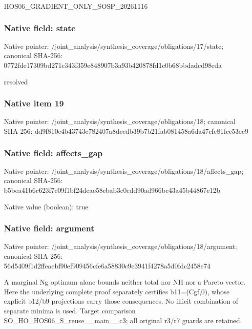 \documentclass[10pt,a4paper]{article}
\begin{document}
\begingroup\raggedright\sloppy HOS06\_\allowbreak{}GRADIENT\_\allowbreak{}ONLY\_\allowbreak{}SOSP\_\allowbreak{}20261116\par\endgroup

\subsubsection{Native field: state}
Native pointer: /joint\_\allowbreak{}analysis/synthesis\_\allowbreak{}coverage/obligations/17/state; canonical SHA-256: 0772fde17309bd271c343f359e848907b3a93b420878fd1e0b68bbdadcd98eda

\begingroup\raggedright\sloppy resolved\par\endgroup

\subsubsection{Native item 19}
Native pointer: /joint\_\allowbreak{}analysis/synthesis\_\allowbreak{}coverage/obligations/18; canonical SHA-256: dd9f810c4b43743e782407a8dcedb39b7b21fab081458a6da47cfc81fcc53ee9

\subsubsection{Native field: affects\_\allowbreak{}gap}
Native pointer: /joint\_\allowbreak{}analysis/synthesis\_\allowbreak{}coverage/obligations/18/affects\_\allowbreak{}gap; canonical SHA-256: b5bea41b6c623f7c09f1bf24dcae58ebab3c0cdd90ad966bc43a45b44867e12b

Native value (boolean): true

\subsubsection{Native field: argument}
Native pointer: /joint\_\allowbreak{}analysis/synthesis\_\allowbreak{}coverage/obligations/18/argument; canonical SHA-256: 56d5409f1d2ffeaebf90ef909456cfe6a58830c9c3941f4278a5d0fdc2458e74

\begingroup\raggedright\sloppy A marginal Ng optimum alone bounds neither total nor NH nor a Pareto vector. Here the underlying complete proof separately certifies b11=\allowbreak{}(Cgf,\allowbreak{}0),\allowbreak{} whose explicit b12/\allowbreak{}b9 projections carry those consequences. No illicit combination of separate minima is used. Target comparison SO\_\allowbreak{}HO\_\allowbreak{}HOS06\_\allowbreak{}S\_\allowbreak{}reuse\_\allowbreak{}\_\allowbreak{}main\_\allowbreak{}\_\allowbreak{}c3;\allowbreak{} all original r3/\allowbreak{}r7 guards are retained.\par\endgroup
\end{document}
